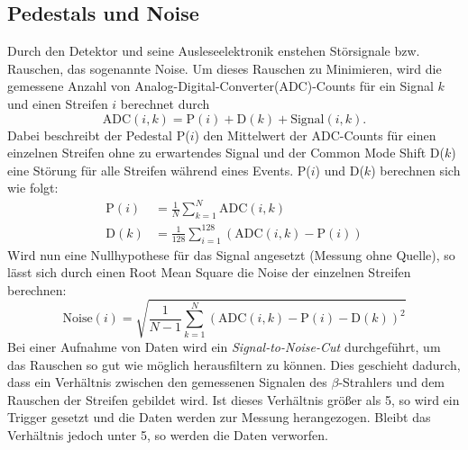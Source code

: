 \FloatBarrier
\subsection{Pedestals und Noise}
\label{sec:Theorie_Noise}
Durch den Detektor und seine Ausleseelektronik enstehen Störsignale bzw. Rauschen, das sogenannte Noise. Um dieses Rauschen zu Minimieren, wird die gemessene Anzahl von Analog-Digital-Converter(ADC)-Counts für ein Signal $k$ und einen Streifen $i$ berechnet durch
\begin{equation*}
  \text{ADC}(i, k) = \text{P}(i) + \text{D}(k) + \text{Signal}(i, k).
\end{equation*}
Dabei beschreibt der Pedestal P($i$) den Mittelwert der ADC-Counts für einen einzelnen Streifen ohne zu erwartendes Signal und der Common Mode Shift D($k$) eine Störung für alle Streifen während eines Events. P($i$) und D($k$) berechnen sich wie folgt:
\begin{align}
  \text{P}(i) &= \frac{1}{N} \sum_{k=1}^N \text{ADC}(i, k)
  \label{eqn:15} \\
  \text{D}(k) &= \frac{1}{128} \sum_{i=1}^{128} \left(\text{ADC}(i, k) - \text{P}(i) \right)
  \label{eqn:18}
\end{align}
Wird nun eine Nullhypothese für das Signal angesetzt (Messung ohne Quelle), so lässt sich durch einen Root Mean Square die Noise der einzelnen Streifen berechnen:
\begin{equation}
  \text{Noise}(i) = \sqrt{ \frac{1}{N-1} \sum_{k=1}^N \left(\text{ADC}(i,k) - \text{P} (i) - \text{D}(k)\right)^2 }
  \label{eqn:16}
\end{equation}
Bei einer Aufnahme von Daten wird ein \textit{Signal-to-Noise-Cut} durchgeführt, um das Rauschen so gut wie möglich herausfiltern zu können. Dies geschieht dadurch, dass ein Verhältnis zwischen den gemessenen Signalen des $\beta$-Strahlers und dem Rauschen der Streifen gebildet wird. Ist dieses Verhältnis größer als 5, so wird ein Trigger gesetzt und die Daten werden zur Messung herangezogen. Bleibt das Verhältnis jedoch unter 5, so werden die Daten verworfen.

